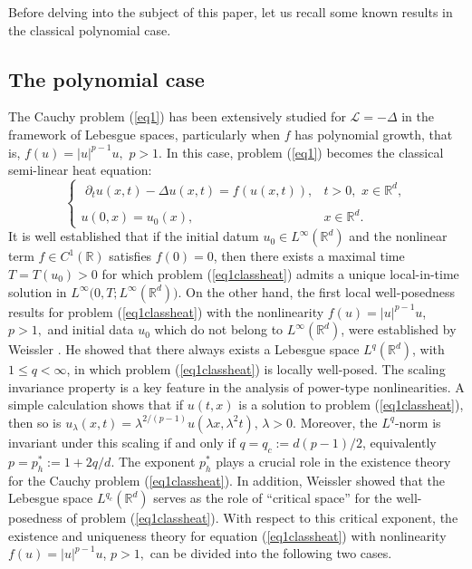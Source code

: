\documentclass[a4paper,11pt]{amsart}
\renewcommand\eqref[1]{(\ref{#1})} %
\numberwithin{equation}{section}
\theoremstyle{plain}
\theoremstyle{definition}
\begin{document}
Before delving into the subject of this paper, let us recall some known results in the classical polynomial case.
\subsection{The polynomial case}
The Cauchy problem \eqref{eq1} has been extensively studied  for $ \mathcal{L}=-\Delta$ in the framework of Lebesgue spaces, particularly when $f$ has polynomial growth, that is, $f(u)=|u|^{p-1}u, \,\,p>1.$ In this case, problem \eqref{eq1} becomes the classical semi-linear heat equation:
\begin{equation}\label{eq1classheat}
\left\{\begin{array}{ll}
\,\, \displaystyle {\partial_tu(x, t)-\Delta  u(x, t) =f(u(x, t)),} &\displaystyle {t>0,\,\,x\in {\mathbb{R}^d},}\\
{}\\
\displaystyle{u(0,x)=  u_0(x),\qquad\qquad}&\displaystyle{x\in {\mathbb{R}^d}.}
\end{array}
\right.
\end{equation} 
It is well established that if the initial datum \(u_0 \in L^\infty(\mathbb{R}^d)\) and the nonlinear term \(f \in C^1(\mathbb{R})\) satisfies \(f(0)=0\), then there exists a maximal time \(T=T(u_0)>0\) for which problem \eqref{eq1classheat} admits a unique local-in-time solution in $L^\infty\!\big(0,T; L^\infty(\mathbb{R}^d)\big)$. On the other hand, the first local well-posedness results for problem \eqref{eq1classheat} with the nonlinearity
$ f(u)=|u|^{p-1}u$, $p>1,$ and initial data $u_0$ which do not belong to $L^\infty(\mathbb{R}^d)$, were established by Weissler \cite{weissler1, weissler2}. He showed that there always exists a Lebesgue space \(L^{q}(\mathbb{R}^{d})\), with \(1 \leq q<\infty\), in which problem \eqref{eq1classheat} is locally well-posed. The scaling invariance property is a key feature in the analysis of power-type nonlinearities. A simple calculation shows that if $u(t, x)$ is a solution to problem  \eqref{eq1classheat}, then so is $u_\lambda(x, t)=\lambda^{2/(p-1)} u( \lambda x, \lambda^2 t), \, \lambda>0$. Moreover, the $L^{q}$-norm is invariant under this scaling if and only if $
q=q_{c}:=d(p-1)/2$, equivalently $p=p_h^*:= 1+2q/d$. The exponent  $p_h^*$ plays a crucial role in the existence theory for the Cauchy problem \eqref{eq1classheat}. In addition, Weissler showed that the Lebesgue space $L^{q_c}(\mathbb{R}^d)$ serves as the role of ``critical space'' for the well-posedness of problem \eqref{eq1classheat}.
With respect to this critical exponent, the existence and uniqueness theory for equation \eqref{eq1classheat} with nonlinearity
$ f(u)=|u|^{p-1}u$, $p>1,$ can be divided into the following two cases.
\end{document}
